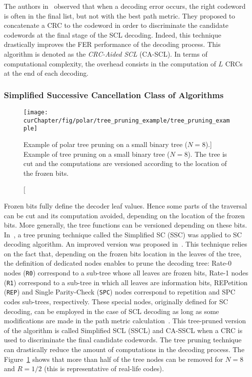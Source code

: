 The authors in~\cite{Tal2011} observed that when a decoding error occurs, the
right codeword is often in the final list, but not with the best path metric.
They proposed to concatenate a CRC to the codeword in order to discriminate the
candidate codewords at the final stage of the SCL decoding. Indeed, this
technique drastically improves the FER performance of the decoding process. This
algorithm is denoted as the \emph{CRC-Aided SCL} (CA-SCL). In terms of
computational complexity, the overhead consists in the computation of $L$ CRCs
at the end of each decoding.

\subsubsection{Simplified Successive Cancellation Class of Algorithms}
\label{sec:ctx_polar_simplified_decoders}

\begin{figure}[htp]
  \centering
  \texttt{[image: \\curChapter/fig/polar/tree\_pruning\_example/tree\_pruning\_example]}
  \caption
    [Example of polar tree pruning on a small binary tree ($N = 8$).]
    {Example of tree pruning on a small binary tree ($N = 8$). The tree is cut
    and the computations are versioned according to the location of the frozen
    bits.}
  \label{fig:ctx_polar_tree_pruning_example}
\end{figure}

Frozen bits fully define the decoder leaf values. Hence some parts of the
traversal can be cut and its computation avoided, depending on the location of
the frozen bits. More generally, the tree functions can be versioned depending
on these bits. In~\cite{Alamdar-Yazdi2011}, a tree pruning technique called the
Simplified SC (SSC) was applied to SC decoding algorithm. An improved version
was proposed in~\cite{Sarkis2014a}. This technique relies on the fact that,
depending on the frozen bits location in the leaves of the tree, the definition
of dedicated nodes enables to prune the decoding tree: Rate-0 nodes (\verb|R0|)
correspond to a sub-tree whose all leaves are frozen bits, Rate-1 nodes
(\verb|R1|) correspond to a sub-tree in which all leaves are information bits,
REPetition (\verb|REP|) and Single Parity-Check (\verb|SPC|) nodes correspond to
repetition and SPC codes sub-trees, respectively. These special nodes,
originally defined for SC decoding, can be employed in the case of SCL decoding
as long as some modifications are made in the path metric
calculation~\cite{Sarkis2016}. This tree-pruned version of the algorithm is
called Simplified SCL (SSCL) and CA-SSCL when a CRC is used to discriminate
the final candidate codewords. The tree pruning technique can drastically reduce
the amount of computations in the decoding process. The
Figure~\ref{fig:ctx_polar_tree_pruning_example} shows that more than half of the
tree nodes can be removed for $N = 8$ and $R = 1 / 2$ (this is representative of
real-life codes).

